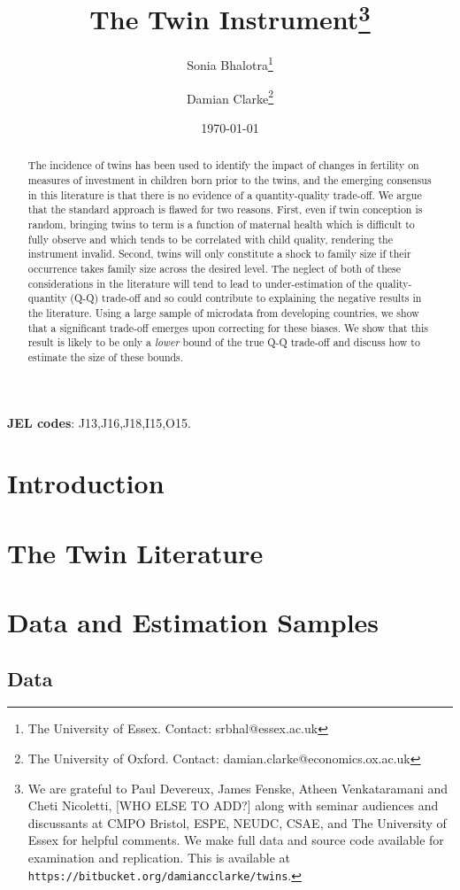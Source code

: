 \documentclass{article}[11pt,subeqn]
\title{The Twin Instrument\footnote{We are grateful to Paul Devereux, James Fenske, 
Atheen Venkataramani and Cheti Nicoletti,  [WHO ELSE TO ADD?] along with seminar 
audiences and discussants at CMPO Bristol, 
ESPE, NEUDC, CSAE, and The University of Essex for helpful comments.  We make full data and
source code available for examination and replication.  This is available at
\texttt{https://bitbucket.org/damiancclarke/twins}.}}
\author{Sonia Bhalotra\thanks{The University of Essex.  Contact: srbhal@essex.ac.uk} 
\and Damian Clarke\thanks{The University of Oxford.  Contact: damian.clarke@economics.ox.ac.uk}}
\date{\today}
\begin{document}
\begin{spacing}{1.4}

\maketitle
\begin{abstract}
 The incidence of twins has been used to identify the impact of changes in fertility 
 on measures of investment in children born prior to the twins, and the emerging 
 consensus in this literature is that there is no evidence of a quantity-quality 
 trade-off. We argue that the standard approach is flawed for two reasons. First, 
 even if twin conception is random, bringing twins to term is a function of maternal 
 health which is difficult to fully observe and which tends to be correlated with 
 child quality, rendering the instrument invalid. Second, twins will only constitute 
 a shock to family size if their occurrence takes family size across the desired 
 level. The neglect of both of these considerations in the literature will tend to 
 lead to under-estimation of the quality-quantity (Q-Q) trade-off and so could 
 contribute to explaining the negative results in the literature. Using a large sample
 of microdata from developing countries, we show that a significant trade-off emerges
 upon correcting for these biases.  We show that this result is likely to be only a 
 \emph{lower} bound of the true Q-Q trade-off and discuss how to estimate the size of
 these bounds. \\
\end{abstract}

\hspace{4mm}\textbf{\small JEL codes}: J13,J16,J18,I15,O15. \\
\newpage
\section{Introduction}


\section{The Twin Literature}


\section{Data and Estimation Samples}
\subsection{Data}



\end{spacing}
\end{document}
